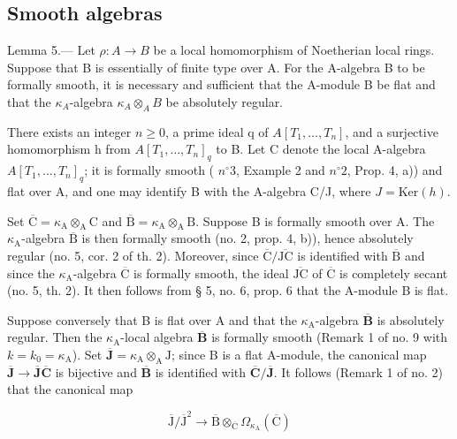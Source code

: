 \subsection{Smooth algebras}

Lemma 5.--- Let \(\rho: A \to B\) be a local homomorphism of Noetherian local rings. Suppose that B is essentially of finite type over A. For the A-algebra B to be formally smooth, it is necessary and sufficient that the A-module B be flat and that the \(\kappa_{A}\)-algebra \(\kappa_{A} \otimes_{A} B\) be absolutely regular.

There exists an integer \(n \geqslant 0\), a prime ideal q of \(A[T_{1}, \ldots, T_{n}]\), and a surjective homomorphism h from \(A[T_{1}, \ldots, T_{n}]_{q}\) to B. Let C denote the local A-algebra \(A[T_{1}, \ldots, T_{n}]_{q}\); it is formally smooth ( \(n^{\circ} 3\), Example 2 and \(n^{\circ} 2\), Prop. 4, a)) and flat over A, and one may identify B with the A-algebra C/J, where \(J = \text{Ker}(h)\).

Set \(\overline{\mathrm{C}} = \kappa_{\mathrm{A}} \otimes_{\mathrm{A}} \mathrm{C}\) and \(\overline{\mathrm{B}} = \kappa_{\mathrm{A}} \otimes_{\mathrm{A}} \mathrm{B}\). Suppose B is formally smooth over A. The \(\kappa_{\mathrm{A}}\)-algebra \(\overline{\mathrm{B}}\) is then formally smooth (no. 2, prop. 4, b)), hence absolutely regular (no. 5, cor. 2 of th. 2). Moreover, since \(\overline{\mathrm{C}} / \overline{\mathrm{JC}}\) is identified with \(\overline{\mathrm{B}}\) and since the \(\kappa_{\mathrm{A}}\)-algebra \(\overline{\mathrm{C}}\) is formally smooth, the ideal \(\overline{\mathrm{JC}}\) of \(\overline{\mathrm{C}}\) is completely secant (no. 5, th. 2). It then follows from § 5, no. 6, prop. 6 that the A-module B is flat.

Suppose conversely that B is flat over A and that the \(\kappa_{\mathrm{A}}\)-algebra \(\overline{\mathbf{B}}\) is absolutely regular. Then the \(\kappa_{\mathrm{A}}\)-local algebra \(\overline{\mathbf{B}}\) is formally smooth (Remark 1 of no. 9 with \(k = k_0 = \kappa_{\mathrm{A}}\)). Set \(\overline{\mathbf{J}} = \kappa_{\mathrm{A}} \otimes_{\mathrm{A}} \mathrm{J}\); since B is a flat A-module, the canonical map \(\overline{\mathbf{J}} \to \overline{\mathbf{J}}\overline{\mathbf{C}}\) is bijective and \(\overline{\mathbf{B}}\) is identified with \(\overline{\mathbf{C}}/\overline{\mathbf{J}}\). It follows (Remark 1 of no. 2) that the canonical map

\[
\overline {{\mathrm{J}}} / \overline {{\mathrm{J}}} ^ {2} \longrightarrow \overline {{\mathrm{B}}} \otimes_ {\overline {{\mathrm{C}}}} \Omega_ {\kappa_ {\mathrm{A}}} (\overline {{\mathrm{C}}})
\]

